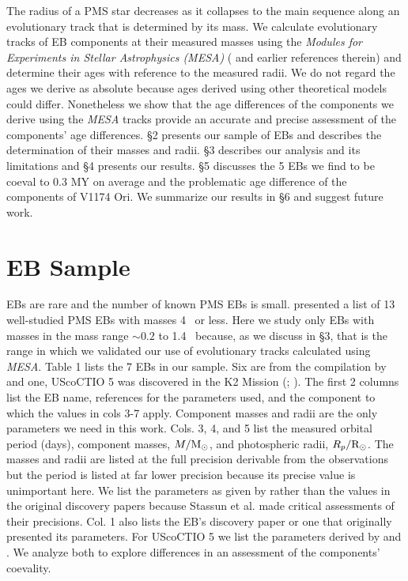 \documentclass[12pt,preprint]{aastex6}
\begin{document}
The radius of a PMS star decreases as it  collapses to the main sequence
along an evolutionary track that is determined by its mass.  We calculate 
evolutionary tracks of EB components at their  measured masses using
the {\it Modules for Experiments in Stellar Astrophysics (MESA)} 
(\citet{2015ApJS..220...15P} and earlier references therein) and 
determine their ages with reference to the measured radii.
 We do not  regard the ages we derive as absolute
because ages derived using other theoretical models could differ.  
Nonetheless we show that the age differences of the components we derive 
using the {\it MESA} tracks provide an accurate and precise  assessment 
of the components' age differences. \S 2 presents our sample of EBs and
describes the determination of their masses and radii.
\S 3 describes our analysis and its limitations and \S 4 presents our results.
\S 5 discusses the 5 EBs we find to be coeval to 0.3 MY on average and the
problematic age difference of the components of V1174 Ori.
 We summarize our  results in \S 6  and 
suggest future work.

\section{EB Sample}

EBs are rare and the number of known PMS EBs is small.  
\citet{2014NewAR..60....1S} presented a list of 13 well-studied PMS EBs 
with masses 4 \msun ~or less.  Here we study only EBs with masses in the 
mass range $\sim 0.2$ to 1.4 \msun ~because, as we discuss in \S 3, that 
is the range in which
we validated our use of evolutionary tracks calculated using {\it MESA}.
Table 1 lists the 7 EBs in our sample.  Six are from the compilation
by \citet{2014NewAR..60....1S} and one, UScoCTIO 5 was discovered in the 
 K2 Mission (\citet{2015ApJ...807....3K}; \citet{2016ApJ...816...21D}). 
The first 2 columns list the EB name, 
references for the parameters used, and the component to which the values
in cols 3-7 apply. Component masses and radii are the only parameters 
we need  in this work. Cols. 3, 4, and 5 list the  measured orbital 
period (days),  component masses, $M/\hbox{M$_\odot$}$, and photospheric radii, 
$R_p/ \hbox{R$_\odot$}$.  The masses and radii are listed at the full precision 
derivable from the observations but the period is listed at far lower 
precision because its precise value
is unimportant here. We list the parameters as given by 
\citet{2014NewAR..60....1S} rather than the values in the original discovery
papers because Stassun et al. made critical assessments of 
their precisions. Col. 1 also lists
the EB's discovery paper or one that originally presented its parameters.
For UScoCTIO 5 we list the 
parameters derived by \citet{2015ApJ...807....3K} and 
\citet{2016ApJ...816...21D}. We analyze both to explore differences in
an assessment of the components' coevality.
\end{document}
